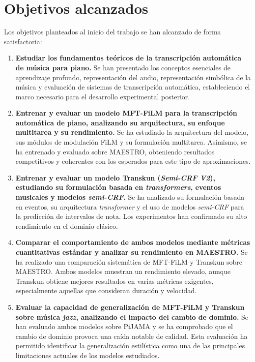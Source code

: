 \documentclass[11pt,spanish,listoffigures,listoftables]{tfgetsinf}
\begin{document}
\section{Objetivos alcanzados}

Los objetivos planteados al inicio del trabajo se han alcanzado de forma satisfactoria:

\begin{enumerate}
    \item \textbf{Estudiar los fundamentos teóricos de la transcripción automática de música para piano.}  
    Se han presentado los conceptos esenciales de aprendizaje profundo, representación del audio, representación
    simbólica de la música y evaluación de sistemas de transcripción automática, estableciendo el marco necesario
    para el desarrollo experimental posterior.

    \item \textbf{Entrenar y evaluar un modelo MFT-FiLM para la transcripción automática de piano, analizando su
    arquitectura, su enfoque multitarea y su rendimiento.}  
    Se ha estudiado la arquitectura del modelo, sus módulos de modulación FiLM y su formulación multitarea. Asimismo,
    se ha entrenado y evaluado sobre MAESTRO, obteniendo resultados competitivos y coherentes con los esperados para
    este tipo de aproximaciones.

    \item \textbf{Entrenar y evaluar un modelo Transkun (\textit{Semi-CRF V2}), estudiando su formulación basada en
    \textit{transformers}, eventos musicales y modelos \textit{semi-CRF}.}  
    Se ha analizado su formulación basada en eventos, su arquitectura \textit{transformer} y el uso de modelos
    \textit{semi-CRF} para la predicción de intervalos de nota. Los experimentos han confirmado su alto rendimiento
    en el dominio clásico.

    \item \textbf{Comparar el comportamiento de ambos modelos mediante métricas cuantitativas estándar y analizar
    su rendimiento en MAESTRO.}  
    Se ha realizado una comparación sistemática de MFT-FiLM y Transkun sobre MAESTRO. Ambos modelos muestran un
    rendimiento elevado, aunque Transkun obtiene mejores resultados en varias métricas exigentes, especialmente
    aquellas que consideran duración y velocidad.

    \item \textbf{Evaluar la capacidad de generalización de MFT-FiLM y Transkun sobre música \textit{jazz}, analizando el
    impacto del cambio de dominio.}  
    Se han evaluado ambos modelos sobre PiJAMA y se ha comprobado que el cambio de dominio provoca una caída notable
    de calidad. Esta evaluación ha permitido identificar la generalización estilística como una de las principales
    limitaciones actuales de los modelos estudiados.
\end{enumerate}
\end{document}
